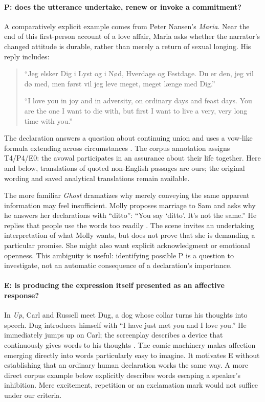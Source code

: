 \documentclass[11pt,a4paper]{article}
\begin{document}
\paragraph{P: does the utterance undertake, renew or invoke a commitment?}
A comparatively explicit example comes from Peter Nansen's \emph{Maria}. Near the end of this first-person account of a love affair, Maria asks whether the narrator's changed attitude is durable, rather than merely a return of sexual longing. His reply includes:
\begin{quote}
“Jeg elsker Dig i Lyst og i Nød, Hverdage og Festdage. Du er den, jeg vil dø med, men først vil jeg leve meget, meget længe med Dig.”

“I love you in joy and in adversity, on ordinary days and feast days. You are the one I want to die with, but first I want to live a very, very long time with you.”
\end{quote}
The declaration answers a question about continuing union and uses a vow-like formula extending across circumstances \citep[sec.~LXI]{nansenMaria}. The corpus annotation assigns T4/P4/E0: the avowal participates in an assurance about their life together. Here and below, translations of quoted non-English passages are ours; the original wording and saved analytical translations remain available.

The more familiar \emph{Ghost} dramatizes why merely conveying the same apparent information may feel insufficient. Molly proposes marriage to Sam and asks why he answers her declarations with “ditto”: “You say ‘ditto’. It's not the same.” He replies that people use the words too readily \citep{rubinGhost}. The scene invites an undertaking interpretation of what Molly wants, but does not prove that she is demanding a particular promise. She might also want explicit acknowledgment or emotional openness. This ambiguity is useful: identifying possible P is a question to investigate, not an automatic consequence of a declaration's importance.

\paragraph{E: is producing the expression itself presented as an affective response?}
In \emph{Up}, Carl and Russell meet Dug, a dog whose collar turns his thoughts into speech. Dug introduces himself with “I have just met you and I love you.” He immediately jumps up on Carl; the screenplay describes a device that continuously gives words to his thoughts \citep[pp.~46--47]{docterPetersonUp}. The comic machinery makes affection emerging directly into words particularly easy to imagine. It motivates E without establishing that an ordinary human declaration works the same way. A more direct corpus example below explicitly describes words escaping a speaker's inhibition. Mere excitement, repetition or an exclamation mark would not suffice under our criteria.
\end{document}
